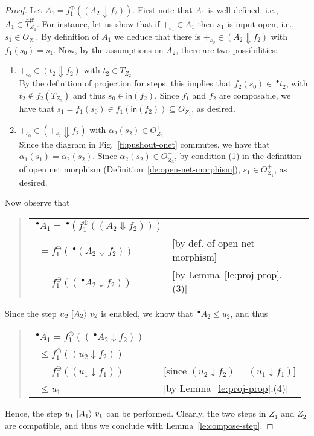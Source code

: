 \documentclass{LMCS}
\newcommand{\inp}[1]{\ensuremath{\mathsf{in}({#1})}}
\newcommand{\monSub}[2]{\ensuremath{{#1}_{#2}^\oplus}}
\newcommand{\res}[2]{\ensuremath{({#1}\!\downarrow\!{#2})}}
\newcommand{\sres}[2]{\ensuremath{({#1}\!\Downarrow\!{#2})}}
\newcommand{\pre}[1][(\cdot)]{\ensuremath{\!~^\bullet{#1}}}
\newcommand{\trans}[1]{\ensuremath{\ [\/{#1}\/\rangle}\ }
\begin{document}
\begin{proof}
  Let $A_1 = \monSub{f}{1}(\sres{A_2}{f_2})$. 
  First note that $A_1$ is well-defined, i.e., $A_1 \in \monSub{\bar{T}}{{Z_1}}$.
For instance, let us show that if $+_{s_1} \in A_1$ then $s_1$ is
  input open, i.e., $s_1 \in O_{Z_1}^+$.  By definition of $A_1$ we
  deduce that there is $+_{s_0} \in \sres{A_2}{f_2}$ with $f_1(s_0)
  =s_1$. Now, by the assumptions on $A_2$, there are two
  possibilities:
  \begin{enumerate}[$\bullet$]
  
  \item $+_{s_0} \in \sres{t_2}{f_2}$ with $t_2 \in T_{Z_2}$\\
    By the definition of projection for steps, this implies that
    $f_2(s_0) \in \pre[t_2]$, with $t_2 \not\in f_2(T_{Z_0})$ and thus
    $s_0 \in \inp{f_2}$.  Since $f_1$ and $f_2$ are composable, we
    have that $s_1 = f_1(s_0) \in f_1(\inp{f_2}) \subseteq O_{Z_1}^+$,
    as desired.

  
  \item $+_{s_0} \in \sres{+_{s_2}}{f_2}$ with $\alpha_2(s_2) \in O_{Z_3}^+$\\
    Since the diagram in Fig.~\ref{fi:pushout-onet} commutes, we have
    that $\alpha_1(s_1) = \alpha_2(s_2)$. Since $\alpha_2(s_2) \in
    O_{Z_3}^+$, by condition (1) in the definition of open net
    morphism (Definition~\ref{de:open-net-morphism}), $s_1 \in
    O_{Z_1}^+$, as desired.
  \end{enumerate}
Now observe that
  \begin{quote}
    \begin{tabular}{lll}
      $\pre[A_1] = \pre[(\monSub{f}{1}(\sres{A_2}{f_2}))]$\\
      \ \quad $= \monSub{f}{1}(\pre[\sres{A_2}{f_2}])$  \quad & [by def. of open
      net morphism]\\
      \ \quad $= \monSub{f}{1}(\res{\pre[A_2]}{f_2})$ & [by Lemma~\ref{le:proj-prop}.(3)]
    \end{tabular}
  \end{quote}

\noindent
Since the step $u_2
  \trans{A_2} v_2$ is enabled, we know that $\pre[A_2] \leq u_2$, and thus
  \begin{quote}
    \begin{tabular}{lll}
      $\pre[A_1] = \monSub{f}{1}(\res{\pre[A_2]}{f_2})$\\
\ \quad $\leq \monSub{f}{1}(\res{u_2}{f_2})$\\
\ \quad $=  \monSub{f}{1}(\res{u_1}{f_1})$  
      & \quad & [since $\res{u_2}{f_2} = \res{u_1}{f_1}$]\\
\ \quad $\leq u_1$& 
      \quad & [by Lemma~\ref{le:proj-prop}.(4)]
    \end{tabular}
  \end{quote}
  Hence, the step $u_1 \trans{A_1} v_1$ can be performed. Clearly, the two
  steps in $Z_1$ and $Z_2$ are compatible, and thus we conclude with
  Lemma~\ref{le:compose-step}.
\end{proof}
\end{document}
